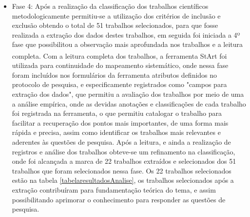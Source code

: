 \begin{itemize}
\item Fase 4: Após a realização da classificação dos trabalhos científicos metodologicamente permitiu-se a utilização dos critérios de inclusão e exclusão obtendo o total de 51 trabalhos selecionados, para que fosse realizada a extração dos dados destes trabalhos, em seguida foi iniciada a 4º fase que possibilitou a observação mais aprofundada nos trabalhos e a leitura completa. Com a leitura completa dos trabalhos, a ferramenta \acrshort{StArt}\textsuperscript{\textregistered} foi utilizada para continuidade do mapeamento sistemático, onde nessa fase foram incluídos nos formulários da ferramenta atributos definidos no protocolo de pesquisa, e especificamente registrados como "campos para extração dos dados", que permitiu a avaliação dos trabalhos por meio de uma a análise empírica, onde as devidas anotações e classificações de cada trabalho foi registrada na ferramenta, o que permitiu catalogar o trabalho para facilitar a recuperação dos pontos mais importantes, de uma forma mais rápida e precisa, assim como identificar os trabalhos mais relevantes e aderentes às questões de pesquisa. Após a leitura, e ainda a realização de registros e análise dos trabalhos obteve-se um refinamento na classificação, onde foi alcançada a marca de 22 trabalhos extraídos e selecionados dos 51 trabalhos que foram selecionados nessa fase. Os 22 trabalhos selecionados estão na tabela \ref{tabelaresultadosAnalise}, os trabalhos selecionados após a extração contribuíram para fundamentação teórica do tema, e assim possibilitando aprimorar o conhecimento para responder as questões de pesquisa. 

\end{itemize}


